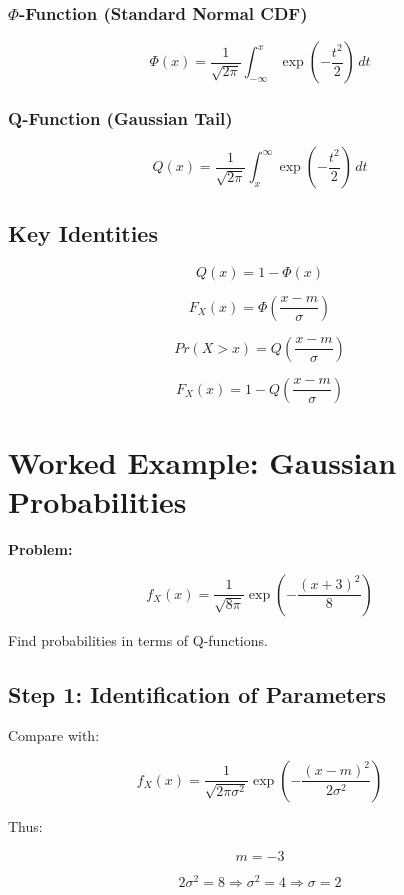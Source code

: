 \documentclass[12pt]{article}
\begin{document}
\subsubsection{$\Phi$-Function (Standard Normal CDF)}

\[
\Phi(x) = \frac{1}{\sqrt{2\pi}}
\int_{-\infty}^{x}
\exp\left(-\frac{t^2}{2}\right)\, dt
\]

\subsubsection{Q-Function (Gaussian Tail)}

\[
Q(x) = \frac{1}{\sqrt{2\pi}}
\int_{x}^{\infty}
\exp\left(-\frac{t^2}{2}\right)\, dt
\]

\subsection{Key Identities}

\[
Q(x) = 1 - \Phi(x)
\]

\[
F_X(x) = \Phi\left(\frac{x-m}{\sigma}\right)
\]

\[
Pr(X > x) = Q\left(\frac{x-m}{\sigma}\right)
\]

\[
F_X(x) = 1 - Q\left(\frac{x-m}{\sigma}\right)
\]

\section{Worked Example: Gaussian Probabilities}

\textbf{Problem:}

\[
f_X(x) =
\frac{1}{\sqrt{8\pi}}
\exp\left(-\frac{(x+3)^2}{8}\right)
\]

Find probabilities in terms of Q-functions.

\subsection{Step 1: Identification of Parameters}

Compare with:

\[
f_X(x)=\frac{1}{\sqrt{2\pi\sigma^2}}
\exp\left(-\frac{(x-m)^2}{2\sigma^2}\right)
\]

Thus:

\[
m = -3
\]

\[
2\sigma^2 = 8 \Rightarrow \sigma^2=4 \Rightarrow \sigma=2
\]
\end{document}
